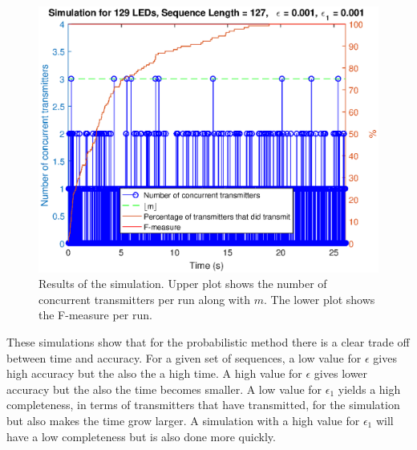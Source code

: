 \begin{figure}[tbp]
	\centering
	\includegraphics[width=\textwidth]{chapters/evaluation-chapters/simulation/sim-concurrent-tx-and-f-measure-eps=001-n=7.eps}
	\caption{Results of the simulation. Upper plot shows the number of concurrent transmitters per run along with $m$. The lower plot shows the F-measure per run.}
	\label{fig:sim-concurrent-tx-and-f-measure-eps=001-n=7}
\end{figure}

 

These simulations show that for the probabilistic method there is a clear trade off between time and accuracy.
For a given set of sequences, a low value for $\epsilon$ gives high accuracy but the also the a high time.
A high value for $\epsilon$ gives lower accuracy but the also the time becomes smaller.
A low value for $\epsilon_1$ yields a high completeness, in terms of transmitters that have transmitted, for the simulation but also makes the time grow larger.
A simulation with a high value for $\epsilon_1$ will have a low completeness but is also done more quickly.